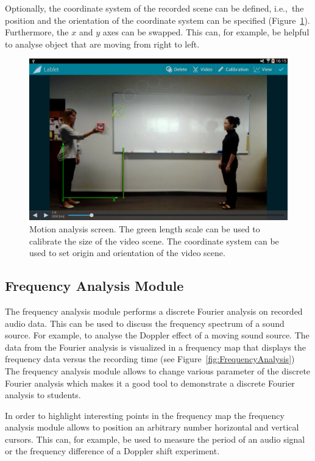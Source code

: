 \documentclass{sigchi}
\newcommand{\ie}{i.e.,\ }
\begin{document}
Optionally, the coordinate system of the recorded scene can be defined, \ie the position and the orientation of the coordinate system can be specified (Figure~\ref{fig:MotionAnalysis}).
Furthermore, the $x$ and $y$ axes can be swapped.
This can, for example, be helpful to analyse object that are moving from right to left.

\begin{figure}
  \centering
  \includegraphics[width=.99\columnwidth]{MotionAnalysis}
  \caption{Motion analysis screen.
  The green length scale can be used to calibrate the size of the video scene.
  The coordinate system can be used to set origin and orientation of the video scene.\label{fig:MotionAnalysis}}
\end{figure}

\subsection{Frequency Analysis Module}
The frequency analysis module performs a discrete Fourier analysis on recorded audio data.
This can be used to discuss the frequency spectrum of a sound source.
For example, to analyse the Doppler effect of a moving sound source.
The data from the Fourier analysis is visualized in a frequency map that displays the frequency data versus the recording time (see Figure~\ref{fig:FrequencyAnalysis})
The frequency analysis module allows to change various parameter of the discrete Fourier analysis which makes it a good tool to demonstrate a discrete Fourier analysis to students.

In order to highlight interesting points in the frequency map the frequency analysis module allows to position an arbitrary number horizontal and vertical cursors.
This can, for example, be used to measure the period of an audio signal or the frequency difference of
a Doppler shift experiment.
\end{document}
